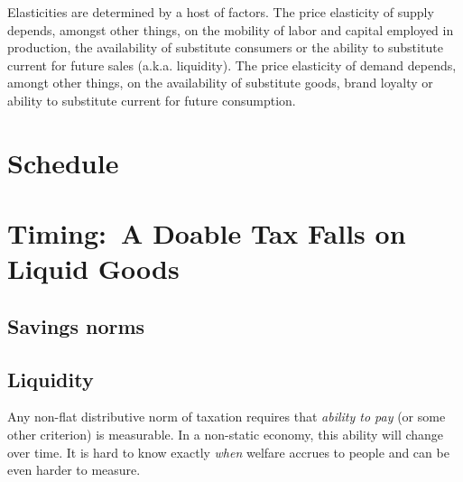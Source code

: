 Elasticities are determined by a host of factors.
The price elasticity of supply depends, amongst other things, on the mobility of labor and capital employed in production, the availability of substitute consumers or the ability to substitute current for future sales (a.k.a.
liquidity).
The price elasticity of demand depends, amongt other things, on the availability of substitute goods, brand loyalty or ability to substitute current for future consumption.

\section[Schedule]{Schedule}
	\label{sec:tax-schedule}


\section[Timing]{Timing:~A Doable Tax Falls on Liquid Goods}
	\label{sec:tax-timing} %

\subsection{Savings norms}


\subsection{Liquidity}



Any non-flat distributive norm of taxation requires that \emph{ability to pay} (or some other criterion) is measurable.
  In a non-static economy, this ability will change over time.
It is hard to know exactly \emph{when} welfare accrues to people and can be even harder to measure.


